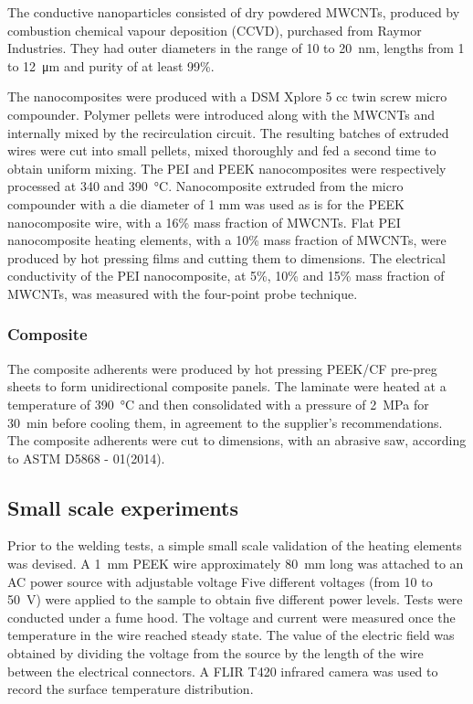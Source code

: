 \documentclass[11pt,review,times]{elsarticle}
\begin{document}
The conductive nanoparticles consisted of dry powdered MWCNTs, produced by combustion chemical vapour deposition (CCVD), purchased from Raymor Industries. 
They had outer diameters in the range of 10 to \SI{20}{\nano\metre}, lengths from 1 to \SI{12}{\micro\metre} and purity of at least 99\%.

The nanocomposites were produced with a DSM Xplore 5 cc twin screw micro compounder. 
Polymer pellets were introduced along with the MWCNTs and internally mixed by the recirculation circuit. 
The resulting batches of extruded wires were cut into small pellets, mixed thoroughly and fed a second time to obtain uniform mixing. 
The PEI and PEEK nanocomposites were respectively processed at 340 and \SI{390}{\celsius}. 
Nanocomposite extruded from the micro compounder with a die diameter of 1 mm was used as is for the PEEK nanocomposite wire, with a 16\% mass fraction of MWCNTs. 
Flat PEI nanocomposite heating elements, with a 10\% mass fraction of MWCNTs, were produced by hot pressing films and cutting them to dimensions. 
The electrical conductivity of the PEI nanocomposite, at 5\%, 10\% and 15\% mass fraction of MWCNTs, was measured with the four-point probe technique. 

\subsubsection{Composite}

The composite adherents were produced by hot pressing PEEK/CF pre-preg sheets to form unidirectional composite panels. 
The laminate were heated at a temperature of \SI{390}{\celsius} and then consolidated with a pressure of \SI{2}{\mega\pascal} for \SI{30}{\minute} before cooling them, in agreement to the supplier's recommendations. 
The composite adherents were cut to dimensions, with an abrasive saw, according to ASTM D5868 - 01(2014). 

\subsection{Small scale experiments}

Prior to the welding tests, a simple small scale validation of the heating elements was devised. 
A \SI{1}{\milli\metre} PEEK wire approximately \SI{80}{\milli\metre} long was attached to an AC power source with adjustable voltage
Five different voltages (from 10 to \SI{50}{\volt}) were applied to the sample to obtain five different power levels. 
Tests were conducted under a fume hood.
The voltage and current were measured once the temperature in the wire reached steady state. 
The value of the electric field was obtained by dividing the voltage from the source by the length of the wire between the electrical connectors. 
A FLIR T420 infrared camera was used to record the surface temperature distribution. 
\end{document}
